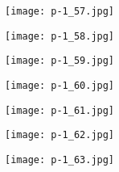 \clearpage


\begin{figure}
    \begin{center}
        \texttt{[image: p-1\_57.jpg]}
        \caption{}
    \end{center}
\end{figure}

\clearpage


\begin{figure}
    \begin{center}
        \texttt{[image: p-1\_58.jpg]}
        \caption{}
    \end{center}
\end{figure}

\clearpage


\begin{figure}
    \begin{center}
        \texttt{[image: p-1\_59.jpg]}
        \caption{}
    \end{center}
\end{figure}

\clearpage


\begin{figure}
    \begin{center}
        \texttt{[image: p-1\_60.jpg]}
        \caption{}
    \end{center}
\end{figure}

\clearpage


\begin{figure}
    \begin{center}
        \texttt{[image: p-1\_61.jpg]}
        \caption{}
    \end{center}
\end{figure}

\clearpage


\begin{figure}
    \begin{center}
        \texttt{[image: p-1\_62.jpg]}
        \caption{}
    \end{center}
\end{figure}

\clearpage


\begin{figure}
    \begin{center}
        \texttt{[image: p-1\_63.jpg]}
        \caption{}
    \end{center}
\end{figure}

